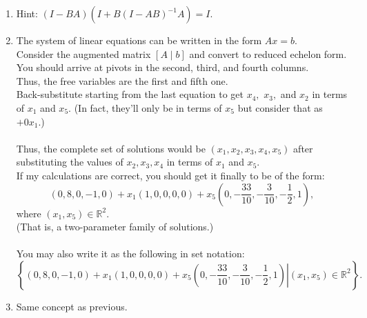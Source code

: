 \documentclass{article}
\begin{document}
\begin{enumerate}
	\item Hint: $(I - BA)(I + B(I - AB)^{-1}A) = I.$
	\item The system of linear equations can be written in the form $Ax = b.$\\
	Consider the augmented matrix $[A\mid b]$ and convert to reduced echelon form.\\
	You should arrive at pivots in the second, third, and fourth columns.\\
	Thus, the free variables are the first and fifth one.\\
	Back-substitute starting from the last equation to get $x_4,$ $x_3,$ and $x_2$ in terms of $x_1$ and $x_5.$ (In fact, they'll only be in terms of $x_5$ but consider that as $+0x_1$.)\\~\\
	Thus, the complete set of solutions would be $(x_1, x_2, x_3, x_4, x_5)$ after substituting the values of $x_2, x_3 ,x_4$ in terms of $x_1$ and $x_5.$\\
	If my calculations are correct, you should get it finally to be of the form:
	\[(0, 8, 0, -1, 0) + x_1(1, 0, 0, 0, 0) + x_5\left(0, -\frac{33}{10}, -\frac{3}{10}, -\frac{1}{2}, 1\right),\]
	where $(x_1, x_5) \in \mathbb{R}^2.$\\
	(That is, a two-parameter family of solutions.)\\~\\
	You may also write it as the following in set notation:
	\[\left\{\left.(0, 8, 0, -1, 0) + x_1(1, 0, 0, 0, 0) + x_5\left(0, -\frac{33}{10}, -\frac{3}{10}, -\frac{1}{2}, 1\right) \right| (x_1, x_5) \in \mathbb{R}^2\right\}.\]
	\item Same concept as previous.
\end{enumerate}
\end{document}

